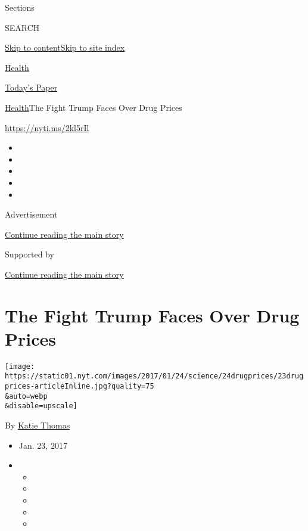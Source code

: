 Sections

SEARCH

\protect\hyperlink{site-content}{Skip to
content}\protect\hyperlink{site-index}{Skip to site index}

\href{https://www.nytimes.com/section/health}{Health}

\href{https://myaccount.nytimes.com/auth/login?response_type=cookie\&client_id=vi}{}

\href{https://www.nytimes.com/section/todayspaper}{Today's Paper}

\href{/section/health}{Health}\textbar{}The Fight Trump Faces Over Drug
Prices

\url{https://nyti.ms/2kl5rIl}

\begin{itemize}
\item
\item
\item
\item
\item
\end{itemize}

Advertisement

\protect\hyperlink{after-top}{Continue reading the main story}

Supported by

\protect\hyperlink{after-sponsor}{Continue reading the main story}

\hypertarget{the-fight-trump-faces-over-drug-prices}{%
\section{The Fight Trump Faces Over Drug
Prices}\label{the-fight-trump-faces-over-drug-prices}}

\texttt{[image: https://static01.nyt.com/images/2017/01/24/science/24drugprices/23drugprices-articleInline.jpg?quality=75\\\&auto=webp\\\&disable=upscale]}

By \href{http://www.nytimes.com/by/katie-thomas}{Katie Thomas}

\begin{itemize}
\item
  Jan. 23, 2017
\item
  \begin{itemize}
  \item
  \item
  \item
  \item
  \item
  \end{itemize}
\end{itemize}

